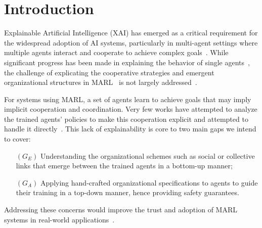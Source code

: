 \documentclass[runningheads]{llncs}
\begin{document}





\section{Introduction}

Explainable Artificial Intelligence (XAI) has emerged as a critical requirement for the widespread adoption of AI systems, particularly in multi-agent settings where multiple agents interact and cooperate to achieve complex goals~\cite{doshivelez2017rigorous,gunning2019xai}. While significant progress has been made in explaining the behavior of single agents~\cite{ribeiro2016classifier,lundberg2017unified}, the challenge of explicating the cooperative strategies and emergent organizational structures in MARL~\cite{busoniu2008survey} is not largely addressed~\cite{kok2006collaborative,omidshafiei2019learning}.

For systems using MARL, a set of agents learn to achieve goals that may imply implicit cooperation and coordination. Very few works have attempted to analyze the trained agents' policies to make this cooperation explicit and attempted to handle it directly~\cite{albrecht2018survey,perolat2017pool}. This lack of explainability is core to two main gaps we intend to cover:
%
\begin{itemize}[wide, labelsep = 1em]
    \item[$(G_E)$] Understanding the organizational schemes such as social or collective links that emerge between the trained agents in a bottom-up manner;
    \item[$(G_A)$] Applying hand-crafted organizational specifications to agents to guide their training in a top-down manner, hence providing safety guarantees.
\end{itemize}
%
Addressing these concerns would improve the trust and adoption of MARL systems in real-world applications~\cite{kok2006collaborative,omidshafiei2019learning}.
\end{document}
